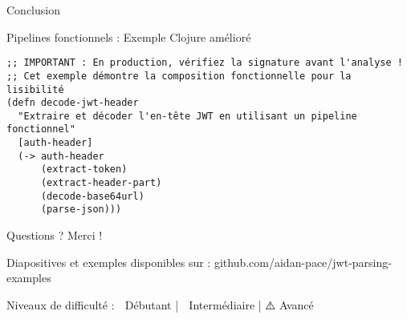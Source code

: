 \documentclass[presentation,aspectratio=169]{beamer}
\begin{document}
\begin{frame}[label={sec:orgc6c3753},fragile]{Conclusion}
\begin{block}{Pipelines fonctionnels : Exemple Clojure amélioré 🧩}
\begin{verbatim}
;; IMPORTANT : En production, vérifiez la signature avant l'analyse !
;; Cet exemple démontre la composition fonctionnelle pour la lisibilité
(defn decode-jwt-header
  "Extraire et décoder l'en-tête JWT en utilisant un pipeline fonctionnel"
  [auth-header]
  (-> auth-header
      (extract-token)
      (extract-header-part)
      (decode-base64url)
      (parse-json)))
\end{verbatim}
\end{block}
\begin{block}{Questions ?}
Merci !

\alert{Diapositives et exemples disponibles sur :} 
github.com/aidan-pace/jwt-parsing-examples

\alert{Niveaux de difficulté :} 🔰 Débutant | 🧩 Intermédiaire | ⚠️ Avancé
\end{block}
\end{frame}
\end{document}
